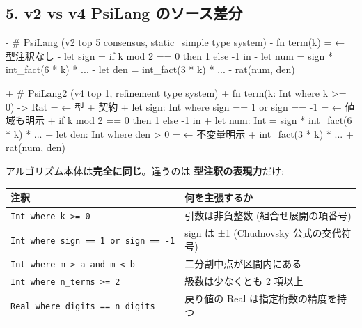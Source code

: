 \documentclass[
]{ltjsarticle}
\newenvironment{Shaded}{}{}
\newcommand{\StringTok}[1]{\textcolor[rgb]{0.25,0.44,0.63}{#1}}
\newcommand{\VariableTok}[1]{\textcolor[rgb]{0.10,0.09,0.49}{#1}}
\newcounter{none} %
\begin{document}
\subsection{5. v2 vs v4 PsiLang
のソース差分}\label{v2-vs-v4-psilang-ux306eux30bdux30fcux30b9ux5deeux5206}

\begin{Shaded}
\begin{Highlighting}[]
\StringTok{{-} \# PsiLang (v2 top 5 consensus, static\_simple type system)}
\StringTok{{-} fn term(k) =                                              ← 型注釈なし}
\StringTok{{-}   let sign = if k mod 2 == 0 then 1 else {-}1 in}
\StringTok{{-}   let num  = sign * int\_fact(6 * k) * ...}
\StringTok{{-}   let den  = int\_fact(3 * k) * ...}
\StringTok{{-}   rat(num, den)}

\VariableTok{+ \# PsiLang2 (v4 top 1, refinement type system)}
\VariableTok{+ fn term(k: Int where k \textgreater{}= 0) {-}\textgreater{} Rat =                     ← 型 + 契約}
\VariableTok{+   let sign: Int where sign == 1 or sign == {-}1 =           ← 値域も明示}
\VariableTok{+     if k mod 2 == 0 then 1 else {-}1 in}
\VariableTok{+   let num: Int = sign * int\_fact(6 * k) * ...}
\VariableTok{+   let den: Int where den \textgreater{} 0 =                            ← 不変量明示}
\VariableTok{+     int\_fact(3 * k) * ...}
\VariableTok{+   rat(num, den)}
\end{Highlighting}
\end{Shaded}

アルゴリズム本体は\textbf{完全に同じ}。違うのは
\textbf{型注釈の表現力}だけ:

{\def\LTcaptype{none} %
\begin{longtable}[]{@{}
  >{\raggedright\arraybackslash}p{}
  >{\raggedright\arraybackslash}p{}@{}}
\toprule\noalign{}
\begin{minipage}[b]{\linewidth}\raggedright
注釈
\end{minipage} & \begin{minipage}[b]{\linewidth}\raggedright
何を主張するか
\end{minipage} \\
\midrule\noalign{}
\endhead
\bottomrule\noalign{}
\endlastfoot
\texttt{Int\ where\ k\ \textgreater{}=\ 0} & 引数は非負整数
(組合せ展開の項番号) \\
\texttt{Int\ where\ sign\ ==\ 1\ or\ sign\ ==\ -1} & sign は ±1
(Chudnovsky 公式の交代符号) \\
\texttt{Int\ where\ m\ \textgreater{}\ a\ and\ m\ \textless{}\ b} &
二分割中点が区間内にある \\
\texttt{Int\ where\ n\_terms\ \textgreater{}=\ 2} & 級数は少なくとも 2
項以上 \\
\texttt{Real\ where\ digits\ ==\ n\_digits} & 戻り値の Real
は指定桁数の精度を持つ \\
\end{longtable}
}
\end{document}
